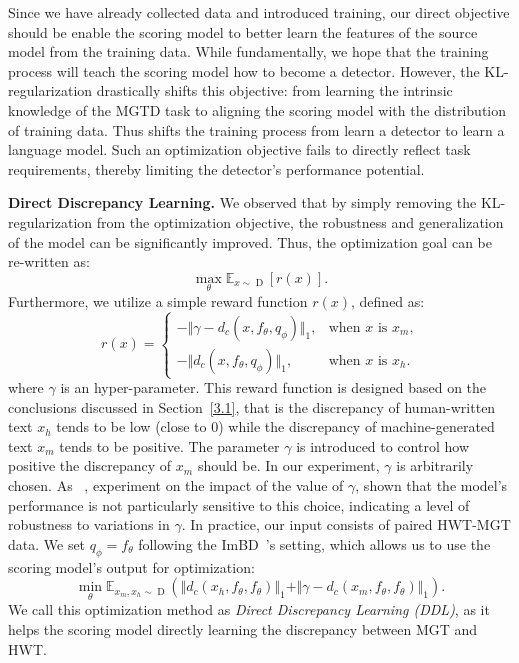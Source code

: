 Since we have already collected data and introduced training, our direct objective should be enable the scoring model to better learn the features of the source model from the training data.
%
While fundamentally, we hope that the training process will teach the scoring model how to become a detector.
%
However, the KL-regularization drastically shifts this objective: from learning the intrinsic knowledge of the MGTD task to aligning the scoring model with the distribution of training data.
%
Thus shifts the training process from learn a detector to learn a language model.
%
Such an optimization objective fails to directly reflect task requirements, thereby limiting the detector's performance potential.


\noindent \textbf{Direct Discrepancy Learning. }
We observed that by simply removing the KL-regularization from the optimization objective, the robustness and generalization of the model can be significantly improved. Thus, the optimization goal can be re-written as:
\begin{equation}
    \mathop{max}_{\theta} \mathbb{E}_{x\sim \mathop{D}}[r(x)].
    \label{3.3.1}
\end{equation}
Furthermore, we utilize a simple reward function $r(x)$, defined as:
\begin{equation}
    r(x) = \begin{cases}
    -\Vert \gamma - d_c(x, f_\theta, q_\phi) \Vert_1, & \text{when $x$ is $x_m$,}\\
    -\Vert d_c(x, f_\theta, q_\phi) \Vert_1, & \text{when $x$ is $x_h$.}
    \end{cases}
    \label{3.3.2}
\end{equation}
where $\gamma$ is an hyper-parameter.
%
This reward function is designed based on the conclusions discussed in Section~\ref{3.1}, that is the discrepancy of human-written text $x_h$ tends to be low (close to 0) while the discrepancy of machine-generated text $x_m$ tends to be positive.
%
The parameter $\gamma$ is introduced to control how positive the discrepancy of $x_m$ should be.
%
In our experiment, $\gamma$ is arbitrarily chosen.
%
As ~, experiment on the impact of the value of $\gamma$, shown that the model's performance is not particularly sensitive to this choice, indicating a level of robustness to variations in $\gamma$. 
%
In practice, our input consists of paired HWT-MGT data. We set $q_\phi = f_\theta$ following the ImBD~\cite{imbd}'s setting, which allows us to use the scoring model’s output for optimization: 
\begin{equation}
    \mathop{min}_\theta \mathbb{E}_{x_m, x_h \sim \mathop{D}}(\Vert d_c(x_h, f_\theta, f_\theta)\Vert_1 + \Vert \gamma - d_c(x_m, f_\theta, f_\theta)\Vert_1).
    \label{3.3.3}
\end{equation}
We call this optimization method as \textit{Direct Discrepancy Learning (DDL)}, as it helps the scoring model directly learning the discrepancy between MGT and HWT.

